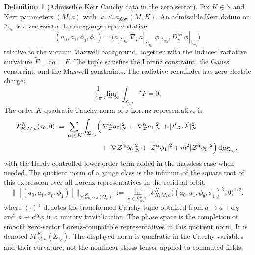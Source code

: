 \documentclass[11pt]{article}
\numberwithin{equation}{section}
\theoremstyle{plain}
\theoremstyle{definition}
\newtheorem{definition}{Definition}[section]
\theoremstyle{remark}
\newcommand{\dd}{\mathrm{d}}
\begin{document}
\begin{definition}[Admissible Kerr Cauchy data in the zero sector]\label{def:kerr-data}
Fix $K\in\mathbb N$ and Kerr parameters $(M,a)$ with $|a|\le a_{\mathrm{slow}}(M,K)$.  An admissible Kerr datum on $\Sigma_{\tau_0}$ is a zero-sector Lorenz-gauge representative
\begin{equation}
(a_0,a_1,\phi_0,\phi_1)
=\bigl(a|_{\Sigma_{\tau_0}},\nabla_n a|_{\Sigma_{\tau_0}},\phi|_{\Sigma_{\tau_0}},D^{\mathrm{ren}}_{n}\phi|_{\Sigma_{\tau_0}}\bigr)
\end{equation}
relative to the vacuum Maxwell background, together with the induced radiative curvature $\widetilde F=\dd a=F$. The tuple satisfies the Lorenz constraint, the Gauss constraint, and the Maxwell constraints. The radiative remainder has zero electric charge:
\begin{equation}
\frac1{4\pi}\lim_{r\to\infty}\int_{S_{\tau_0,r}}{}^\star\widetilde F=0.
\end{equation}
The order-$K$ quadratic Cauchy norm of a Lorenz representative is
\begin{eqnarray}
\mathcal E^N_{K,M,a}(\tau_0;0)
:=\sum_{|\alpha|\le K}\int_{\Sigma_{\tau_0}}
\Bigl(&|\nabla_{\mathcal Z}^{\alpha}a_0|_{N}^{2}+|\nabla_{\mathcal Z}^{\alpha}a_1|_{N}^{2}
+|\mathcal L_{\mathcal Z^\alpha}\widetilde F|_N^2 \nonumber\\
&+|\nabla\mathcal Z^\alpha\phi_0|_{N}^{2}
+|\mathcal Z^\alpha\phi_1|^{2}
+m^2|\mathcal Z^\alpha\phi_0|^{2}
\Bigr)\,\dd\mu_{\Sigma_{\tau_0}},
\end{eqnarray}
with the Hardy-controlled lower-order term added in the massless case when needed. The quotient norm of a gauge class is the infimum of the square root of this expression over all Lorenz representatives in the residual orbit,
\begin{equation}
\|[(a_0,a_1,\phi_0,\phi_1)]\|_{\mathcal H^K_{\mathrm{ren},M,a}(Q_e)}
:=
\inf_{\chi\in\mathcal G^{K+1}_{\mathrm{res}}}
\mathcal E^N_{K,M,a}\bigl((a_0,a_1,\phi_0,\phi_1)^{\chi};0\bigr)^{1/2},
\end{equation}
where $(\cdot)^{\chi}$ denotes the transformed Cauchy tuple obtained from $a\mapsto a+\dd\chi$ and $\phi\mapsto e^{i\chi}\phi$ in a unitary trivialization. The phase space is the completion of smooth zero-sector Lorenz-compatible representatives in this quotient norm.  It is denoted \(\mathcal H^K_{M,a}(\Sigma_{\tau_0})\). The displayed norm is quadratic in the Cauchy variables and their curvature, not the nonlinear stress tensor applied to commuted fields.
\end{definition}
\end{document}
